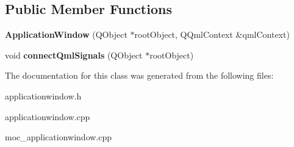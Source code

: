 \subsection*{Public Member Functions}
\begin{DoxyCompactItemize}
\item 
{\bfseries Application\-Window} (Q\-Object $\ast$root\-Object, Q\-Qml\-Context \&qml\-Context)\label{class_application_window_a9ed3a7e865a416a3e414fd19d67e69bb}

\item 
void {\bfseries connect\-Qml\-Signals} (Q\-Object $\ast$root\-Object)\label{class_application_window_a8763dd7b8c8a313b98a3ed06ddab0748}

\end{DoxyCompactItemize}


The documentation for this class was generated from the following files\-:\begin{DoxyCompactItemize}
\item 
applicationwindow.\-h\item 
applicationwindow.\-cpp\item 
moc\-\_\-applicationwindow.\-cpp\end{DoxyCompactItemize}
